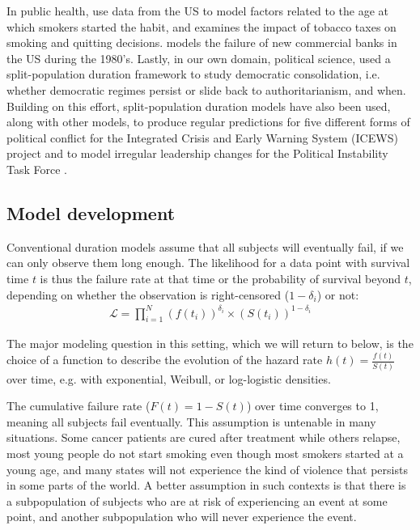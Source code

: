 \documentclass[letter]{article}
\begin{document}
In public health, \citet{douglas1994hazard} use data from the US to model factors related to the age at which smokers started the habit, and \citet{forster2001role} examines the impact of tobacco taxes on smoking and quitting decisions. \citet{deyoung2003failure} models the failure of new commercial banks in the US during the 1980's. Lastly, in our own domain, political science, \citet{svolik2008authoritarian} used a split-population duration framework to study democratic consolidation, i.e. whether democratic regimes persist or slide back to authoritarianism, and when. Building on this effort, split-population duration models have also been used, along with other models, to produce regular predictions for five different forms of political conflict for the Integrated Crisis and Early Warning System (ICEWS) project \citep{ward2013learning} and to model irregular leadership changes for the Political Instability Task Force \citep[PITF; ][]{beger2014ensemble}.

\subsection{Model development}

Conventional duration models assume that all subjects will eventually fail, if we can only observe them long enough. The likelihood for a data point with survival time $t$ is thus the failure rate at that time or the probability of survival beyond $t$, depending on whether the observation is right-censored ($1-\delta_i$) or not:
\begin{eqnarray}
\mathcal{L} = \prod_{i=1}^N  \left( f(t_i)\right)^{\delta_i} \times \left( S(t_i) \right)^{1-\delta_i}
\end{eqnarray}

The major modeling question in this setting, which we will return to below, is the choice of a function to describe the evolution of the hazard rate $h(t) = \frac{f(t)}{S(t)}$ over time, e.g. with exponential, Weibull, or log-logistic densities. 

The cumulative failure rate ($F(t) = 1 - S(t)$) over time converges to 1, meaning all subjects fail eventually. This assumption is untenable in many situations. Some cancer patients are cured after treatment while others relapse, most young people do not start smoking even though most smokers started at a young age, and many states will not experience the kind of violence that persists in some parts of the world. A better assumption in such contexts is that there is a subpopulation of subjects who are at risk of experiencing an event at some point, and another subpopulation who will never experience the event.
\end{document}
